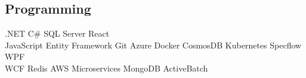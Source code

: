\documentclass[]{deedy-resume-openfont}
\begin{document}
\begin{minipage}[t]{0.33\textwidth}
\subsection{Programming}

.NET \textbullet{}   C\# \textbullet{} SQL Server \textbullet{} React  \textbullet{}\\ JavaScript \textbullet{} Entity Framework \textbullet{} Git \textbullet{} Azure
\textbullet{} Docker \textbullet{} CosmosDB \textbullet{} Kubernetes \textbullet{} Specflow \textbullet{}  WPF \textbullet{} \\WCF \textbullet{} Redis \textbullet{} AWS \textbullet{} Microservices \textbullet{} MongoDB \textbullet{} ActiveBatch
\sectionsep

%
%

\end{minipage} 
\hfill
\end{document}

